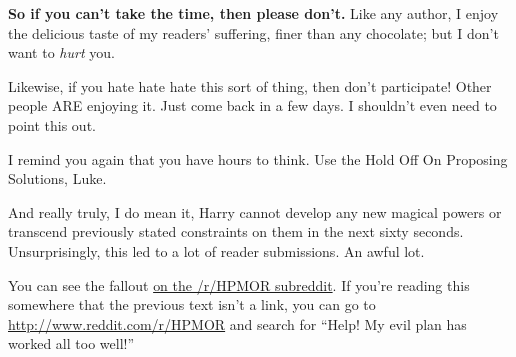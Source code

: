 {\textbf{So if you can’t take the time, then please don’t.} Like any author, I enjoy the delicious taste of my readers’ suffering, finer than any chocolate; but I don’t want to \emph{hurt} you.

Likewise, if you hate hate hate this sort of thing, then don’t participate! Other people ARE enjoying it. Just come back in a few days. I shouldn’t even need to point this out.

I remind you again that you have hours to think. Use the Hold Off On Proposing Solutions, Luke.

And really truly, I do mean it, Harry cannot develop any new magical powers or transcend previously stated constraints on them in the next sixty seconds.
\later
Unsurprisingly, this led to a lot of reader submissions. An awful lot.

You can see the
fallout \href{http://www.reddit.com/r/HPMOR/comments/2xnyi0/113_help_my_evil_plan_has_worked_all_too_well/}{on the /r/HPMOR subreddit}. 
If you’re reading this somewhere that the previous text isn’t a link, you can go to \url{http://www.reddit.com/r/HPMOR} and search for “Help! My evil plan has worked all too well!”
}
